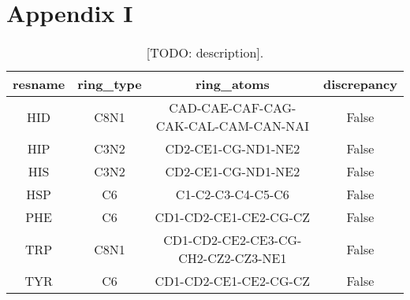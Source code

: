 \chapter*{Appendix I}

\begin{table}[H]
  \caption{\label{tab:methods/aromatic_prot} [TODO: description].}
  \centering
  \begin{tabular}{cccc}
    \hline
    resname & ring\_type & ring\_atoms                         & discrepancy \\ \hline
    HID     & C8N1       & CAD-CAE-CAF-CAG-CAK-CAL-CAM-CAN-NAI & False       \\
    HIP     & C3N2       & CD2-CE1-CG-ND1-NE2                  & False       \\
    HIS     & C3N2       & CD2-CE1-CG-ND1-NE2                  & False       \\
    HSP     & C6         & C1-C2-C3-C4-C5-C6                   & False       \\
    PHE     & C6         & CD1-CD2-CE1-CE2-CG-CZ               & False       \\
    TRP     & C8N1       & CD1-CD2-CE2-CE3-CG-CH2-CZ2-CZ3-NE1  & False       \\
    TYR     & C6         & CD1-CD2-CE1-CE2-CG-CZ               & False       \\ \hline
  \end{tabular}
\end{table}

